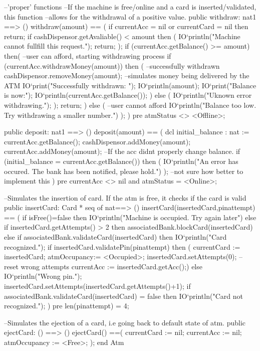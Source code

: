\documentclass[a4paper]{article}
\begin{document}
\begin{vdm_al}
    --'proper' functions
    --If the machine is free/online and a card is inserted/validated, this function
    --allows for the withdrawal of a positive value. 
    public withdraw: nat1 ==> ()
    withdraw(amount) == (
        if currentAcc = nil or currentCard = nil then return;
        if cashDispensor.getAvaliable() < amount then (
            IO`println("Machine cannot fullfill this request.");
            return;
        );
        if (currentAcc.getBalance() >= amount) then( --user can afford, starting withdrawing process
            if (currentAcc.withdrawMoney(amount)) then ( --successfully withdrawn
                cashDispensor.removeMoney(amount); --simulates money being delivered by the ATM
                IO`print("Successfully withdrawn: ");
                IO`println(amount);
                IO`print("Balance is now:");
                IO`println(currentAcc.getBalance());
                )
                else (
                    IO`println("Uknown error withdrawing.");
                );
        return;
        ) 
        else ( --user cannot afford
            IO`println("Balance too low. Try withdrawing a smaller number.")
        );  
    )
    pre atmStatus <> <Offline>;

    public deposit: nat1 ==> ()
    deposit(amount) == (
        dcl initial_balance : nat := currentAcc.getBalance();
        cashDispensor.addMoney(amount);
        currentAcc.addMoney(amount);
        --If the acc didnt properly change balance.
        if (initial_balance = currentAcc.getBalance()) then (
            IO`println("An error has occured. The bank has been notified, please hold.")
        ); --not sure how better to implement this
    )
    pre currentAcc <> nil and atmStatus = <Online>;



    --Simulates the insertion of card. If the atm is free, it checks if the card is valid
    public insertCard: Card * seq of nat==> ()
    insertCard(insertedCard,pinattempt) == (
        if isFree()=false
        then IO`println("Machine is occupied. Try again later")
        else if insertedCard.getAttempts() > 2 then associatedBank.blockCard(insertedCard)
        else if associatedBank.validateCard(insertedCard)
        then IO`println("Card recognized.");
            if insertedCard.validatePin(pinattempt) then (
                currentCard := insertedCard;
                atmOccupancy:= <Occupied>;
                insertedCard.setAttempts(0); --reset wrong attempts 
                currentAcc := insertedCard.getAcc();)
            else 
            IO`println("Wrong pin.");
            insertedCard.setAttempts(insertedCard.getAttempts()+1);
        if associatedBank.validateCard(insertedCard) = false then IO`println("Card not recognized.");
    )
    pre len(pinattempt) = 4;
    
    --Simulates the ejection of a card, i.e going back to default state of atm.
    public ejectCard: () ==> () 
    ejectCard() ==(
        currentCard := nil;
        currentAcc := nil;
        atmOccupancy := <Free>;
    );    
end Atm
\end{vdm_al}
\end{document}

